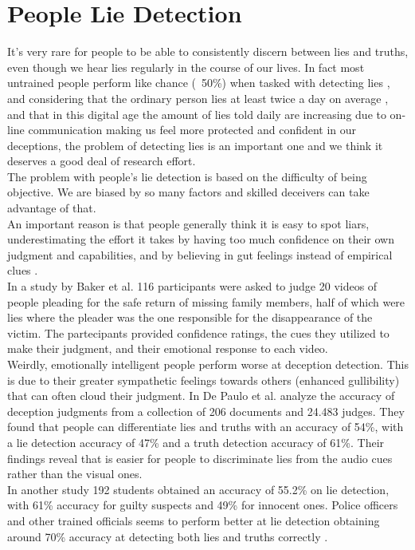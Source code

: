 \section{People Lie Detection} \label{pplLieDet}
It's very rare for people to be able to consistently discern between lies and truths, even though we hear lies regularly in the course of our lives. In fact most untrained people perform like chance (~50\%) when tasked with detecting lies \cite{Porter2012SecretsAL}, and considering that the ordinary person lies at least twice a day on average \cite{LyingEverydayLife}, and that in this digital age the amount of lies told daily are increasing \cite{DigitalDeception} due to on-line communication making us feel more protected and confident in our deceptions, the problem of detecting lies is an important one and we think it deserves a good deal of research effort. \\
The problem with people's lie detection is based on the difficulty of being objective. We are biased by so many factors and skilled deceivers can take advantage of that. \\
An important reason is that people generally think it is easy to spot liars, underestimating the effort it takes by having too much confidence on their own judgment and capabilities, and by believing in gut feelings instead of empirical clues \cite{VrijDLD}. \\
In a study by Baker et al.  \cite{EmotionallyIntelligent} 116 participants were asked to judge 20 videos of people pleading for the safe return of missing family members, half of which were lies where the pleader was the one responsible for the disappearance of the victim. The partecipants provided confidence ratings, the cues they utilized to make their judgment, and their emotional response to each video.\\
Weirdly, emotionally intelligent people perform worse at deception detection. This is due to their greater sympathetic feelings towards others (enhanced gullibility) that can often cloud their judgment.
In \cite{BondDePauloAccuracy} De Paulo et al. analyze the accuracy of deception judgments from a collection of 206 documents and 24.483 judges. They found that people can differentiate lies and truths with an accuracy of 54\%, with a lie detection accuracy of 47\% and a truth detection accuracy of 61\%. Their findings reveal that is easier for people to discriminate lies from the audio cues rather than the visual ones. \\
In another study \cite{HartwigGranhag} 192 students obtained an accuracy of 55.2\% on lie detection, with 61\% accuracy for guilty suspects and 49\% for innocent ones. Police officers and other trained officials seems to perform better at lie detection obtaining around 70\% accuracy at detecting both lies and truths correctly \cite{VrijPoliceDetect}.

